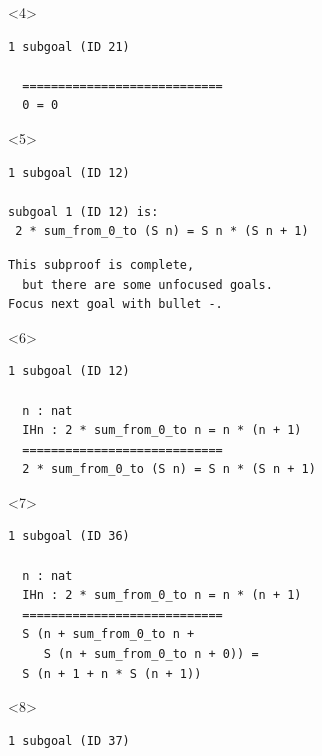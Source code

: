 \documentclass{beamer}
\begin{document}
\begin{frame}[fragile]
\begin{columns}
\begin{column}{0.7\textwidth}
    \begin{onlyenv}<4>
    \minipage[c][0.65\textheight][s]{\columnwidth}
    \begin{verbatim}
1 subgoal (ID 21)
  
  ============================
  0 = 0
    \end{verbatim}
    \endminipage
    \end{onlyenv}

    \begin{onlyenv}<5>
    \minipage[c][0.65\textheight][s]{\columnwidth}
    \begin{verbatim}
1 subgoal (ID 12)

subgoal 1 (ID 12) is:
 2 * sum_from_0_to (S n) = S n * (S n + 1)
    \end{verbatim}

    \vspace{5ex}

    \begin{Verbatim}[fontshape=it]
This subproof is complete,
  but there are some unfocused goals.
Focus next goal with bullet -.
    \end{Verbatim}
    \endminipage
    \end{onlyenv}

    \begin{onlyenv}<6>
    \minipage[c][0.65\textheight][s]{\columnwidth}
    \begin{verbatim}
1 subgoal (ID 12)
  
  n : nat
  IHn : 2 * sum_from_0_to n = n * (n + 1)
  ============================
  2 * sum_from_0_to (S n) = S n * (S n + 1)
    \end{verbatim}
    \endminipage
    \end{onlyenv}

    \begin{onlyenv}<7>
    \minipage[c][0.65\textheight][s]{\columnwidth}
    \begin{verbatim}
1 subgoal (ID 36)
  
  n : nat
  IHn : 2 * sum_from_0_to n = n * (n + 1)
  ============================
  S (n + sum_from_0_to n +
     S (n + sum_from_0_to n + 0)) =
  S (n + 1 + n * S (n + 1))
    \end{verbatim}
    \endminipage
    \end{onlyenv}

    \begin{onlyenv}<8>
    \minipage[c][0.65\textheight][s]{\columnwidth}
    \begin{verbatim}
1 subgoal (ID 37)
  

\end{verbatim}
\end{onlyenv}
\end{column}
\end{columns}
\end{frame}
\end{document}
